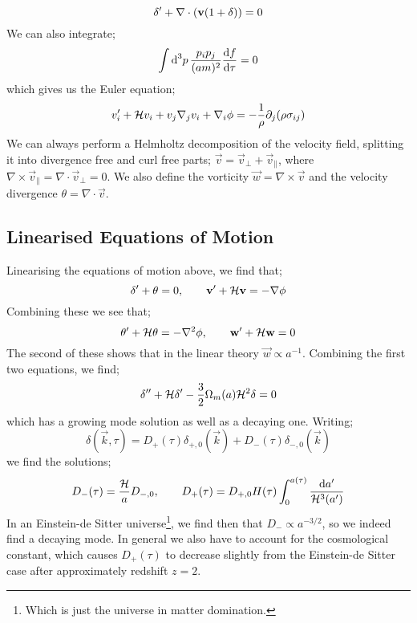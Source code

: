 \begin{equation}
\delta\pr + \nabla\cdot\left(\vec{v}\left(1 + \delta\right)\right) = 0
\end{equation}
We can also integrate;
\begin{equation*}
\int{\text{d}^3 p \,\frac{p_i p_j}{(am)^2}\frac{\text{d}f}{\text{d}\tau}} = 0
\end{equation*}
which gives us the Euler equation;
\begin{equation}
v_i^{\prime} + \mathcal{H} v_i + v_j \nabla_j v_i + \nabla_i \phi = - \frac{1}{\rho}\partial_j(\rho \sigma_{ij})
\end{equation}
We can always perform a Helmholtz decomposition of the velocity field, splitting it into divergence free and curl free parts; $\vec{v} = \vec{v}_{\perp} + \vec{v}_{\parallel}$, where $\nabla \times \vec{v}_{\parallel} = \nabla\cdot\vec{v}_{\perp} = 0$. We also define the vorticity $\vec{w} = \nabla \times \vec{v}$ and the velocity divergence $\theta = \nabla \cdot \vec{v}$.
\subsection{Linearised Equations of Motion} 
Linearising the equations of motion above, we find that;
\begin{equation*}
\delta^{\prime} + \theta = 0, \qquad \mathbf{v}^{\prime} + \mathcal{H} \mathbf{v} = - \nabla \phi
\end{equation*}
Combining these we see that;
\begin{equation*}
\theta^{\prime} + \mathcal{H} \theta = - \nabla^2 \phi, \qquad \mathbf{w}^{\prime} + \mathcal{H} \mathbf{w} = 0
\end{equation*}
The second of these shows that in the linear theory $\vec{w} \propto a^{-1}$. Combining the first two equations, we find;
\begin{equation}
\delta^{\prime\prime} + \mathcal{H} \delta^{\prime} - \frac{3}{2}\Omega_{m}(a)\mathcal{H}^2 \delta = 0
\end{equation}
which has a growing mode solution as well as a decaying one. Writing;
\begin{equation*}
\delta(\vec{k}, \tau) = D_+(\tau)\delta_{+,0}(\vec{k}) + D_-(\tau)\delta_{-,0}(\vec{k})
\end{equation*}
we find the solutions;
\begin{equation}
D_-(\tau) = \frac{\mathcal{H}}{a}D_{-,0}, \qquad D_+(\tau) = D_{+,0}H(\tau)\int_0^{a(\tau)}{\frac{\text{d} a^{\prime}}{\mathcal{H}^3(a^{\prime})}}
\end{equation}
In an Einstein-de Sitter universe\footnote{Which is just the universe in matter domination.}, we find then that $D_- \propto a^{-3/2}$, so we indeed find a decaying mode. In general we also have to account for the cosmological constant, which causes $D_+(\tau)$ to decrease slightly from the Einstein-de Sitter case after approximately redshift $z = 2$. 

